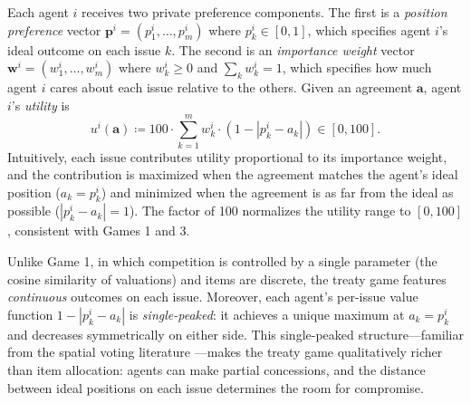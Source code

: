 Each agent $i$ receives two private preference components.
The first is a \emph{position preference} vector $\bm{p}^{i} = (p^{i}_{1}, \dots, p^{i}_{m})$ where $p^{i}_{k} \in [0,1]$, which specifies agent $i$'s ideal outcome on each issue $k$.
The second is an \emph{importance weight} vector $\bm{w}^{i} = (w^{i}_{1}, \dots, w^{i}_{m})$ where $w^{i}_{k} \geq 0$ and $\sum_{k} w^{i}_{k} = 1$, which specifies how much agent $i$ cares about each issue relative to the others.
Given an agreement $\bm{a}$, agent $i$'s \emph{utility} is
\begin{equation}
    u^i(\bm{a}) \coloneqq 100 \cdot \sum_{k=1}^{m} w^{i}_{k} \cdot (1 - |p^{i}_{k} - a_k|) \in [0,100].
\end{equation}
Intuitively, each issue contributes utility proportional to its importance weight, and the contribution is maximized when the agreement matches the agent's ideal position ($a_k = p^{i}_{k}$) and minimized when the agreement is as far from the ideal as possible ($|p^{i}_{k} - a_k| = 1$).
The factor of 100 normalizes the utility range to $[0, 100]$, consistent with Games 1 and 3.

Unlike Game 1, in which competition is controlled by a single parameter (the cosine similarity of valuations) and items are discrete, the treaty game features \emph{continuous} outcomes on each issue.
Moreover, each agent's per-issue value function $1 - |p^i_k - a_k|$ is \emph{single-peaked}: it achieves a unique maximum at $a_k = p^i_k$ and decreases symmetrically on either side.
This single-peaked structure---familiar from the spatial voting literature \citep{black1948rationale}---makes the treaty game qualitatively richer than item allocation: agents can make partial concessions, and the distance between ideal positions on each issue determines the room for compromise.

